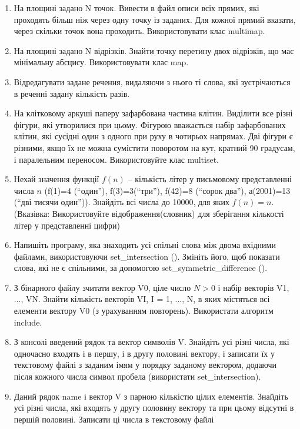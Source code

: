 \documentclass[]{article}
\begin{document}
\begin{enumerate}
\def\labelenumi{\arabic{enumi}.}
\item
  На площині задано N точок. Вивести в файл описи всіх прямих, які
  проходять більш ніж через одну точку із заданих. Для кожної прямий
  вказати, через скільки точок вона проходить. Використовувати клас
  multimap.
\item
  На площині задано N відрізків. Знайти точку перетину двох відрізків,
  що має мінімальну абсцису. Використовувати клас map.
\item
  Відредагувати задане речення, видаляючи з нього ті слова, які
  зустрічаються в реченні задану кількість разів.
\item
  На клітковому аркуші паперу зафарбована частина клітин. Виділити все
  різні фігури, які утворилися при цьому. Фігурою вважається набір
  зафарбованих клітин, які сусідні один з одного при руху в чотирьох
  напрямах. Дві фігури є різними, якщо їх не можна сумістити поворотом
  на кут, кратний 90 градусам, і паралельним переносом. Використовуйте
  клас multiset.
\item
  Нехай значення функції \(f(n)\) -- кількість літер у письмовому
  представленні числа \(n\) (f(1)=4 (``один''), f(3)=3(``три''), f(42)=8
  (``сорок два''), а(2001)=13 (``дві тисячи один'')). Знайдіть всі числа
  до 10000, для яких \(f(n) = n\). (Вказівка: Використовуйте
  відображення(словник) для зберігання кількості літер у представленні
  цифри)
\item
  Напишіть програму, яка знаходить усі спільні слова між двома вхідними
  файлами, використовуючи set\_intersection (). Змініть його, щоб
  показати слова, які не є спільними, за допомогою
  set\_symmetric\_difference ().
\item
  З бінарного файлу зчитати вектор V0, ціле число \(N > 0\) і набір
  векторів V1, ..., VN. Знайти кількість векторів VI, I = 1, ..., N, в
  яких містяться всі елементи вектору V0 (з урахуванням повторень).
  Використати алгоритм include.
\item
  З консолі введений рядок та вектор символів V. Знайдіть усі різні
  числа, які одночасно входять і в першу, і в другу половині вектору, і
  записати їх у текстовому файлі з заданим імям у порядку заданому
  вектором, додаючи після кожного числа символ пробела (використати
  set\_intersection).
\item
  Даний рядок name і вектор V з парною кількістю цілих елементів.
  Знайдіть усі різні числа, які входять у другу половину вектору та при
  цьому відсутні в першій половині. Записати ці числа в текстовому файлі

\end{enumerate}
\end{document}
